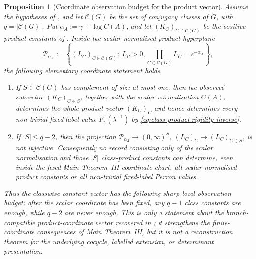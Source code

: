 \documentclass[11pt,a4paper]{amsart}
\theoremstyle{plain}
\newtheorem{proposition}[theorem]{Proposition}
\theoremstyle{definition}
\theoremstyle{remark}
\begin{document}
\begin{proposition}[Coordinate observation budget for the product vector]
  \label{prop:class-product-coordinate-observation-budget}
  Assume the hypotheses of , and let
  \(\mathcal C(G)\) be the set of conjugacy classes of \(G\), with
  \(q=|\mathcal C(G)|\).  Put
  \(\alpha_A:=\gamma+\log C(A)\), and let \((K_C)_{C\in\mathcal C(G)}\) be
  the positive product constants of .
  Inside the scalar-normalised product hyperplane
  \begin{equation}\label{eq:q-minus-one-product-hyperplane}
    \mathcal P_{\alpha_A}:=
    \left\{(L_C)_{C\in\mathcal C(G)}:\ L_C>0,
      \prod_{C\in\mathcal C(G)}L_C=e^{-\alpha_A}\right\},
  \end{equation}
  the following elementary coordinate statement holds.
  \begin{enumerate}[label=\textup{(\roman*)},leftmargin=*]
    \item If \(S\subset\mathcal C(G)\) has complement of size at most one,
      then the observed subvector \((K_C)_{C\in S}\), together with the scalar
      normalisation \(C(A)\), determines the whole product vector
      \((K_C)_C\) and hence determines every non-trivial fixed-label value
      \(F_\pi(\lambda^{-1})\) by
      \eqref{eq:class-product-rigidity-inverse}.
    \item If \(|S|\le q-2\), then the projection
      \(\mathcal P_{\alpha_A}\to(0,\infty)^S\),
      \((L_C)_C\mapsto(L_C)_{C\in S}\), is not injective.  Consequently no
      record consisting only of the scalar normalisation and those
      \(|S|\) class-product constants can determine, even inside the fixed
      Main Theorem~III coordinate chart, all scalar-normalised product
      constants or all non-trivial fixed-label Perron values.
  \end{enumerate}
  Thus the classwise constant vector has the following sharp local observation budget:
  after the scalar coordinate has been fixed, any \(q-1\) class constants are
  enough, while \(q-2\) are never enough.  This is only a statement about the
  branch-compatible product-coordinate vector recovered in
  ;
  it strengthens the finite-coordinate consequences of Main Theorem~III, but
  it is not a reconstruction theorem for the underlying cocycle, labelled
  extension, or determinant presentation.
\end{proposition}
\end{document}
